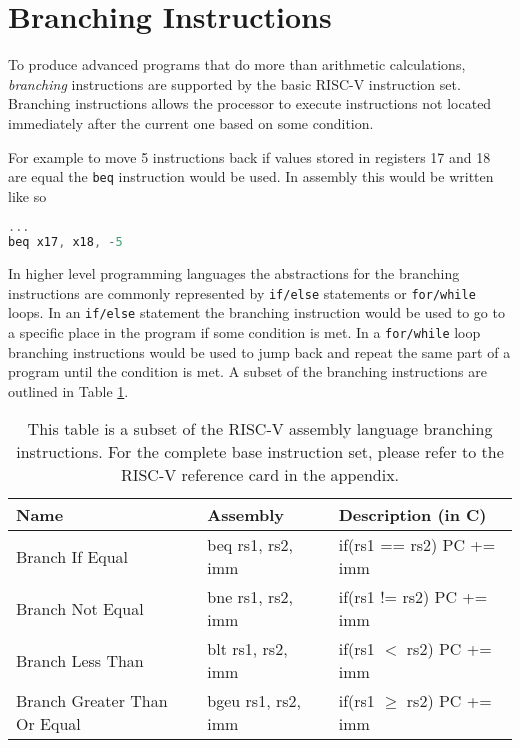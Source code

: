         
    \section{Branching Instructions}
        To produce advanced programs that do more than arithmetic calculations, \textit{branching} instructions are supported by the basic RISC-V instruction set.
        Branching instructions allows the processor to execute instructions not located immediately after the current one based on some condition. 
        
        For example to move 5 instructions back if values stored in registers 17 and 18 are equal the \texttt{beq} instruction would be used. In assembly this would be written like so
        \begin{lstlisting}[language=C]
...
beq x17, x18, -5
        \end{lstlisting}
        
        In higher level programming languages the abstractions for the branching instructions are commonly represented by \texttt{if/else} statements or \texttt{for/while} loops. In an \texttt{if/else} statement the branching instruction would be used to go to a specific place in the program if some condition is met. In a \texttt{for/while} loop branching instructions would be used to jump back and repeat the same part of a program until the condition is met. A subset of the branching instructions are outlined in Table \ref{table:RISCVBranchingInstructions}.
       
        \begin{table}[h!]
            \centering
            \begin{tabular}{|l|l|l|}
            	\hline
            	Name                         & Assembly           & Description (in C)          \\ \hline
            	Branch If Equal              & beq rs1, rs2, imm  & if(rs1 == rs2) PC += imm    \\
            	Branch Not Equal             & bne rs1, rs2, imm  & if(rs1 != rs2) PC += imm    \\
            	Branch Less Than             & blt rs1, rs2, imm  & if(rs1 $<$ rs2) PC += imm   \\
            	Branch Greater Than Or Equal & bgeu rs1, rs2, imm & if(rs1 $\ge$ rs2) PC += imm \\ \hline
            \end{tabular}
            \caption{This table is a subset of the RISC-V assembly language branching instructions. For the complete base instruction set, please refer to the RISC-V reference card in the appendix.}
            \label{table:RISCVBranchingInstructions}
        \end{table}
        
